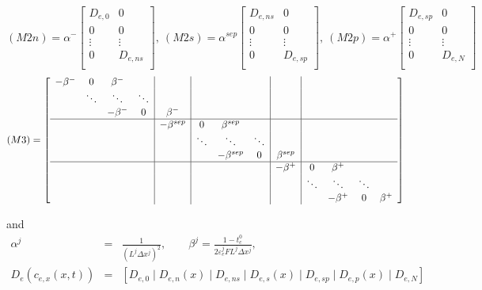 \documentclass[12pt]{article}
\begin{document}
\begin{equation}
(M2n) = 
\alpha^{-} \left[
\begin{array}{cc}
  D_{e,0} & 0 \\
  0 & 0 \\
  \vdots & \vdots \\
  0 & D_{e,ns} \\
\end{array}
\right], \
(M2s) = 
\alpha^{sep} \left[
\begin{array}{cc}
  D_{e,ns} & 0 \\
  0 & 0 \\
  \vdots & \vdots \\
  0 & D_{e,sp} \\
\end{array}
\right], \
(M2p) = 
\alpha^{+} \left[
\begin{array}{cc}
  D_{e,sp} & 0 \\
  0 & 0 \\
  \vdots & \vdots \\
  0 & D_{e,N} \\
\end{array}
\right]
\end{equation}
\begin{equation}
(M3) = 
\left[
\begin{array}{cccc |c| ccc |c| cccc}
  -\beta^{-} & 0 & \beta^{-} &  &  &  &  &  &  &  &  &  &  \\
   & \ddots & \ddots & \ddots &  &  &  &  &  &  &  &  &  \\
   &  & -\beta^{-} & 0 & \beta^{-} &  &  &  &  &  &  &  &  \\
   \hline
   &  &  &  & -\beta^{sep} &  0 &  \beta^{sep}  &  &  &  &  &  &  \\
   &  &  &  &  & \ddots & \ddots & \ddots &  &  &  &  &  \\
   &  &  &  &  &  & -\beta^{sep} & 0 & \beta^{sep} &  &  &  &  \\
   \hline
   &  &  &  &  & &  &   & -\beta^{+} & 0 & \beta^{+} &  &  \\
   &  &  &  &  & &  &   &  & \ddots & \ddots & \ddots &  \\
   &  &  &  &  & &  &   &  &  & -\beta^{+} & 0 & \beta^{+} \\
\end{array}
\right]
\end{equation}

and
\begin{eqnarray}
	\alpha^{j} &=& \frac{1}{\left(L^{j} \Delta x^{j} \right)^{2}}, \qquad \beta^{j} = \frac{1 - t_{c}^{0}}{2 \varepsilon_{e}^{j} F L^{j} \Delta x^{j}}, \\
	D_{e}(c_{e,x}(x,t)) &=& \left[ D_{e,0} \mid D_{e,n}(x) \mid D_{e,ns} \mid D_{e,s}(x) \mid D_{e,sp} \mid D_{e,p}(x) \mid D_{e,N} \right]
\end{eqnarray}
\end{document}
